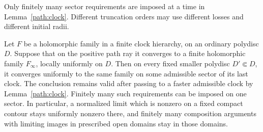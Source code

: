 Only finitely many sector requirements are imposed at a time in
Lemma~\ref{path:clock}.  Different truncation orders may use different
losses and different initial radii.

\begin{lemma}
\label{path:family-limits}
Let \(F\) be a holomorphic family in a finite clock hierarchy,
on an ordinary polydisc \(D\).  Suppose that on the positive path
ray it converges to a finite holomorphic family \(F_\infty\),
locally uniformly on \(D\).  Then on every fixed smaller polydisc
\(D'\Subset D\), it converges uniformly to the same family on
some admissible sector of its last clock.  The conclusion remains
valid after passing to a faster admissible clock by
Lemma~\ref{path:clock}.  Finitely many such requirements can be
imposed on one sector.  In particular, a normalized limit which
is nonzero on a fixed compact contour stays uniformly nonzero
there, and finitely many composition arguments with limiting
images in prescribed open domains stay in those domains.
\end{lemma}
